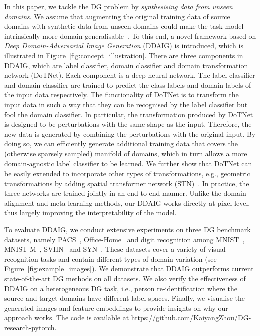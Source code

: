 \documentclass[letterpaper]{article}
\begin{document}
In this paper, we tackle the DG problem by \emph{synthesising data from unseen domains}. We assume that augmenting the original training data of source domains with synthetic data from unseen domains could make the task model intrinsically more domain-generalisable~\cite{DomainRandomization,yue2019domain}. To this end, a novel framework based on \emph{Deep Domain-Adversarial Image Generation} (DDAIG) is introduced, which is illustrated in Figure~\ref{fig:concept_illustration}. There are three components in DDAIG, which are label classifier, domain classifier and domain transformation network (DoTNet). Each component is a deep neural network. The label classifier and domain classifier are trained to predict the class labels and domain labels of the input data respectively. The functionality of DoTNet is to transform the input data in such a way that they can be recognised by the label classifier but fool the domain classifier. In particular, the transformation produced by DoTNet is designed to be perturbations with the same shape as the input. Therefore, the new data is generated by combining the perturbations with the original input. By doing so, we can efficiently generate additional training data that covers the (otherwise sparsely sampled) manifold of domains, which in turn allows a more domain-agnostic label classifier to be learned. We further show that DoTNet can be easily extended to incorporate other types of transformations, e.g., geometric transformations by adding spatial transformer network (STN)~\cite{nips15stn}. In practice, the three networks are trained jointly in an end-to-end manner. Unlike the domain alignment and meta learning methods, our DDAIG works directly at pixel-level, thus largely improving the interpretability of the model.

To evaluate DDAIG, we conduct extensive experiments on three DG benchmark datasets, namely PACS~\cite{li2017deeper}, Office-Home~\cite{office_home} and digit recognition among MNIST~\cite{lecun1998mnist}, MNIST-M~\cite{ganin2015unsupervised}, SVHN~\cite{netzer2011svhn} and SYN~\cite{ganin2015unsupervised}. These datasets cover a variety of visual recognition tasks and contain different types of domain variation (see Figure~\ref{fig:example_images}). We demonstrate that DDAIG outperforms current state-of-the-art DG methods on all datasets. We also verify the effectiveness of DDAIG on a heterogeneous DG task, i.e., person re-identification where the source and target domains have different label spaces. Finally, we visualise the generated images and feature embeddings to provide insights on why our approach works.
The code is available at {https://github.com/KaiyangZhou/DG-research-pytorch}.
\end{document}

